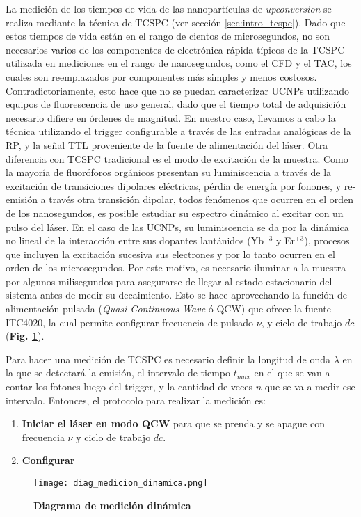 La medición de los tiempos de vida de las nanopartículas de \textit{upconversion} se realiza mediante la técnica de TCSPC (ver sección \ref{sec:intro_tcspc}).
Dado que estos tiempos de vida están en el rango de cientos de microsegundos, no son necesarios varios de los componentes de electrónica rápida típicos de la TCSPC utilizada en mediciones en el rango de nanosegundos, como el CFD y el TAC, los cuales son reemplazados por componentes más simples y menos costosos.
Contradictoriamente, esto hace que no se puedan caracterizar UCNPs utilizando equipos de fluorescencia de uso general, dado que el tiempo total de adquisición necesario difiere en órdenes de magnitud.
En nuestro caso, llevamos a cabo la técnica utilizando el trigger configurable a través de las entradas analógicas de la RP, y la señal TTL proveniente de la fuente de alimentación del láser.
Otra diferencia con TCSPC tradicional es el modo de excitación de la muestra.
Como la mayoría de fluoróforos orgánicos presentan su luminiscencia a través de la excitación de transiciones dipolares eléctricas, pérdia de energía por fonones, y re-emisión a través otra transición dipolar, todos fenómenos que ocurren en el orden de los nanosegundos, es posible estudiar su espectro dinámico al excitar con un pulso del láser.
En el caso de las UCNPs, su luminiscencia se da por la dinámica no lineal de la interacción entre sus dopantes lantánidos (Yb$^{+3}$ y Er$^{+3}$), procesos que incluyen la excitación sucesiva sus electrones y por lo tanto ocurren en el orden de los microsegundos.
Por este motivo, es necesario iluminar a la muestra por algunos milisegundos para asegurarse de llegar al estado estacionario del sistema antes de medir su decaimiento.
Esto se hace aprovechando la función de alimentación pulsada (\textit{Quasi Continuous Wave} ó QCW) que ofrece la fuente ITC4020, la cual permite configurar frecuencia de pulsado $\nu$, y ciclo de trabajo $dc$ (\textbf{Fig. \ref{fig:diag_medicion_dinamica}}).

Para hacer una medición de TCSPC es necesario definir la longitud de onda $\lambda$ en la que se detectará la emisión, el intervalo de tiempo $t_{max}$ en el que se van a contar los fotones luego del trigger, y la cantidad de veces $n$ que se va a medir ese intervalo.
Entonces, el protocolo para realizar la medición es:

\begin{enumerate}
     \item \textbf{Iniciar el láser en modo QCW} para que se prenda y se apague con frecuencia $\nu$ y ciclo de trabajo $dc$.
     \item \textbf{Configurar }
\end{enumerate}


\begin{figure}
     \centering
     \texttt{[image: diag\_medicion\_dinamica.png]}
     \caption{\textbf{Diagrama de medición dinámica}}
     \label{fig:diag_medicion_dinamica}
\end{figure}

